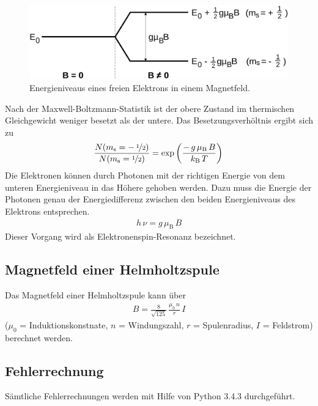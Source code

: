 \begin{figure}[H]
	\centering
	\includegraphics[width=\linewidth]{picture/EnergiequantelungElektron.pdf}
	\caption{Energieniveaus eines freien Elektrons in einem Magnetfeld. \cite{V28}}
	\label{fig:EnergiequantelungElektron}
\end{figure}

Nach der Maxwell-Boltzmann-Statistik ist der obere Zustand im thermischen Gleichgewicht weniger besetzt als der untere. Das Besetzungsverhöltnis ergibt sich zu
\begin{align}
	\frac{N(m_\text{s} = -\,\nicefrac{1}{2})}{N(m_\text{s} = \nicefrac{1}{2})} = \exp\left( \frac{-\,g\,\mu_\text{B}\,B}{k_\text{B}\,T} \right)
\end{align}
Die Elektronen können durch Photonen mit der richtigen Energie von dem unteren Energieniveau in das Höhere gehoben werden. Dazu muss die Energie der Photonen genau der Energiedifferenz zwischen den beiden Energieniveaus des Elektrons entsprechen.
\begin{align}
	h\,\nu = g\, \mu_\text{B}\, B
	\label{eqn:lande}
\end{align}
Dieser Vorgang wird als Elektronenspin-Resonanz bezeichnet.



\subsection{Magnetfeld einer Helmholtzspule}
Das Magnetfeld einer Helmholtzspule kann über
\begin{align}
  \label{eqn:BHelm} %
  B = \frac{8}{\sqrt{125}}\, \frac{\mu_0\, n}{r}\, I
\end{align}
\hfill {\footnotesize($\mu_0$ = Induktionskonstnate, $n$ = Windungszahl, $r$ = Spulenradius, $I$ = Feldstrom)} \hfill \vspace{0.25cm}\\
berechnet werden.


\newpage
\subsection{Fehlerrechnung}
Sämtliche Fehlerrechnungen werden mit Hilfe von Python 3.4.3 durchgeführt.
